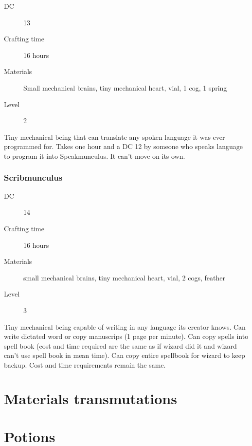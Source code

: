 \begin{description}
\item [DC] 13 \arcana
\item [Crafting time] 16 hours
\item [Materials] Small mechanical brains, tiny mechanical heart, vial, 1 cog, 1 spring
\item [Level] 2
\end{description}

Tiny mechanical being that can translate any spoken language it was ever programmed for. Takes one hour and a DC 12 \itelligence by someone who speaks language to program it into Speakmunculus. It can't move on its own.

\subsubsection{Scribmunculus}

\begin{description}
\item [DC] 14 \arcana
\item [Crafting time] 16 hours
\item [Materials] small mechanical brains, tiny mechanical heart, vial, 2 cogs, feather
\item [Level] 3
\end{description}

Tiny mechanical being capable of writing in any language its creator knows. Can write dictated word or copy manuscrips (1 page per minute). Can copy spells into spell book (cost and time required are the same as if wizard did it and wizard can't use spell book in mean time). Can copy entire spellbook for wizard to keep backup. Cost and time requirements remain the same. 

\section{Materials transmutations}

\section{Potions}